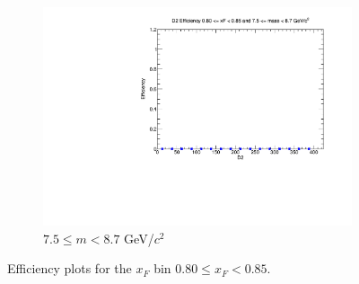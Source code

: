 \begin{figure}[p]
\begin{subfigure}[b]{0.32\textwidth}
        \includegraphics[width=\textwidth]{./kTrackerEfficiencyPlots/D2_Efficiency_xF16_mass10.pdf}
        \caption{$7.5 \leq m < 8.7$ GeV/$c^2$}
        \label{fig:xF16_mass10}
    \end{subfigure}
    \hfill
    \caption{Efficiency plots for the $x_F$ bin $0.80 \leq x_F < 0.85$.}
    \label{fig:xF16}
\end{figure}

\clearpage

